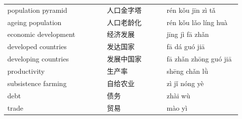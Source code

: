 \documentclass[11pt]{article}
\begin{document}
\begin{longtable}{@{}p{0.40\linewidth}p{0.24\linewidth}p{0.30\linewidth}@{}}
population pyramid & 人口金字塔 & rén kǒu jīn zì tǎ \\
ageing population & 人口老龄化 & rén kǒu lǎo líng huà \\
economic development & 经济发展 & jīng jì fā zhǎn \\
developed countries & 发达国家 & fā dá guó jiā \\
developing countries & 发展中国家 & fā zhǎn zhōng guó jiā \\
productivity & 生产率 & shēng chǎn lǜ \\
subsistence farming & 自给农业 & zì jǐ nóng yè \\
debt & 债务 & zhài wù \\
trade & 贸易 & mào yì \\
\end{longtable}
\end{document}

